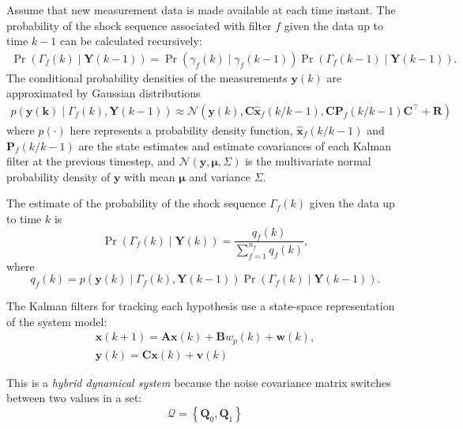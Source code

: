 Assume that new measurement data is made available at each time instant. The probability of the shock sequence associated with filter $f$ given the data up to time $k-1$ can be calculated recursively:
\begin{multline} \label{eq:Pr_Gammakp1_given_Yk}
	\Pr(\Gamma_f(k) \mid \mathbf{Y}(k-1)) = 
	\Pr(\gamma_f(k) \mid \gamma_f(k-1)) \Pr(\Gamma_f(k-1) \mid \mathbf{Y}(k-1)).
\end{multline}
The conditional probability densities of the measurements $\mathbf{y}(k)$ are approximated by Gaussian distributions
\begin{multline} \label{eq:p_yk_given_Gammak_Ykm1}
	p(\mathbf{y(k)} \mid \Gamma_f(k), \mathbf{Y}(k-1)) \approx
	\mathcal{N}\left(\mathbf{y}(k), \mathbf{C} \mathbf{\hat{x}}_{f}(k/k-1), \mathbf{C} \mathbf{P}_f(k/k-1) \mathbf{C}^\intercal+\mathbf{R}\right)
\end{multline}
where $p(\cdot)$ here represents a probability density function, $\mathbf{\hat{x}}_{f}(k/k-1)$ and $\mathbf{P}_f(k/k-1)$ are the state estimates and estimate covariances of each Kalman filter at the previous timestep, and $\mathcal{N}(\mathbf{y}, \mathbf{\mu}, \Sigma)$ is the multivariate normal probability density of $\mathbf{y}$ with mean $\mathbf{\mu}$ and variance $\Sigma$.

The estimate of the probability of the shock sequence $\Gamma_f(k)$ given the data up to time $k$ is
\begin{equation} \label{eq:Pr_Gammak_given_Yk}
	\Pr(\Gamma_f(k) \mid \mathbf{Y}(k)) = \frac{q_f(k)}{\sum_{f=1}^{n_f} q_f(k)},
\end{equation}
where
\begin{equation} \label{eq:qfk}
	q_f(k) = p(\mathbf{y}(k) \mid \Gamma_f(k), \mathbf{Y}(k-1)) \Pr(\Gamma_f(k) \mid \mathbf{Y}(k-1)).
\end{equation}

The Kalman filters for tracking each hypothesis use a state-space representation of the system model:
\begin{equation} \label{eq:obs_model}
	\begin{aligned}
		\mathbf{x}(k+1) = \mathbf{A} \mathbf{x}(k) + \mathbf{B} w_p(k) + \mathbf{w}(k), \\
		\mathbf{y}(k) = \mathbf{C} \mathbf{x}(k) + \mathbf{v}(k)
	\end{aligned}
\end{equation}

This is a \textit{hybrid dynamical system} because the noise covariance matrix switches between two values in a set:
\begin{equation} \label{eq:init_Q_R}
	\mathcal{Q} = \left\{\mathbf{Q}_0, \mathbf{Q}_1\right\}
\end{equation}

